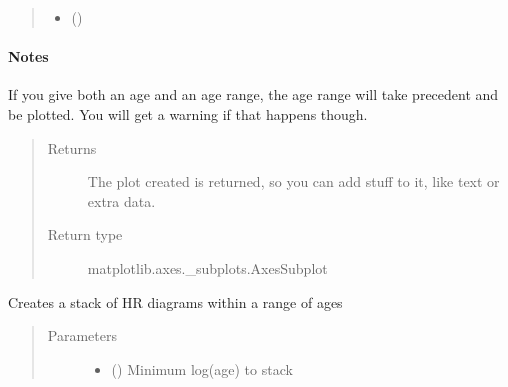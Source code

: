 \documentclass[letterpaper,10pt,english]{sphinxmanual}
\begin{document}
\begin{fulllineitems}
\begin{fulllineitems}
\begin{quote}
\begin{description}
\begin{itemize}
\item {} 
 (\sphinxstyleliteralemphasis{\sphinxupquote{, }}) \textendash{} 

\end{itemize}

\end{description}\end{quote}
\paragraph{Notes}

If you give both an age and an age range, the age range will take precedent and be plotted.
You will get a warning if that happens though.
\begin{quote}\begin{description}
\item[{Returns}] \leavevmode
The plot created is returned, so you can add stuff to it, like text or extra data.

\item[{Return type}] \leavevmode
matplotlib.axes.\_subplots.AxesSubplot

\end{description}\end{quote}

\end{fulllineitems}


\begin{fulllineitems}
\label{\detokenize{hrdiagrams:hoki.hrdiagrams.HRDiagram.stack}}
Creates a stack of HR diagrams within a range of ages
\begin{quote}\begin{description}
\item[{Parameters}] \leavevmode\begin{itemize}
\item {} 
 (\sphinxstyleliteralemphasis{\sphinxupquote{, }}) \textendash{} Minimum log(age) to stack


\end{itemize}
\end{description}
\end{quote}
\end{fulllineitems}
\end{fulllineitems}
\end{document}
